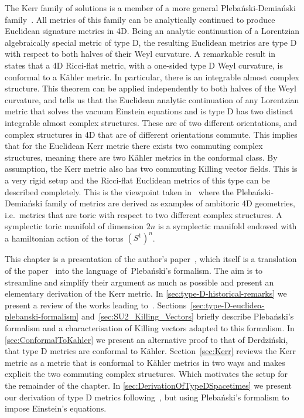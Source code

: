 \documentclass[10pt]{report}
\newcommand{\pleb}[0]{Pleba\'nski}
\newcommand{\demi}[0]{Demia\'nski}
\newcommand{\derd}[0]{Derdzi\'nski}
\theoremstyle{definition}
\begin{document}
The Kerr family of solutions is a member of a more general \pleb{}-\demi{} family~\cite{RotatingChargPleban1976}. All metrics of this family can be analytically continued to produce Euclidean signature metrics in 4D. Being an analytic continuation of a Lorentzian algebraically special metric of type D, the resulting Euclidean metrics are type D with respect to both halves of their Weyl curvature. A remarkable result in~\cite{SelfDualKahleDerdzi1983} states that a 4D Ricci-flat metric, with a one-sided type D Weyl curvature, is conformal to a K\"ahler metric. In particular, there is an integrable almost complex structure. This theorem can be applied independently to both halves of the Weyl curvature, and tells us that the Euclidean analytic continuation of any Lorentzian metric that solves the vacuum Einstein equations and is type D has two distinct integrable almost complex structures. These are of two different orientations, and complex structures in 4D that are of different orientations commute. This implies that for the Euclidean Kerr metric there exists two commuting complex structures, meaning there are two K\"ahler metrics in the conformal class. By assumption, the Kerr metric also has two commuting Killing vector fields. This is a very rigid setup and the Ricci-flat Euclidean metrics of this type can be described completely. This is the viewpoint taken in~\cite{AmbitoricGeomeAposto2013} where the \pleb{}-\demi{} family of metrics are derived as examples of ambitoric 4D geometries, i.e.\ metrics that are toric with respect to two different complex structures. A symplectic toric manifold of dimension $2n$ is a symplectic manifold endowed with a hamiltonian action of the torus ${(S^1)}^n$.

This chapter is a presentation of the author's paper~\cite{Kerr_metric_fro_Krasno_2024}, which itself is a translation of the paper~\cite{AmbitoricGeomeAposto2013} into the language of~\pleb{}'s formalism. The aim is to streamline and simplify their argument as much as possible and present an elementary derivation of the Kerr metric. In \cref{sec:type-D-historical-remarks} we present a review of the works leading to~\cite{AmbitoricGeomeAposto2013}. Sections~\ref{sec:type-D-euclidea-plebanski-formalism} and~\ref{sec:SU2_Killing_Vectors} briefly describe \pleb{}'s formalism and a characterisation of Killing vectors adapted to this formalism. In \cref{sec:ConformalToKahler} we present an alternative proof to that of \derd{}, that type D metrics are conformal to K\"ahler. Section~\ref{sec:Kerr} reviews the Kerr metric as a metric that is conformal to K\"ahler metrics in two ways and makes explicit the two commuting complex structures. Which motivates the setup for the remainder of the chapter. In \cref{sec:DerivationOfTypeDSpacetimes} we present our derivation of type D metrics following~\cite{AmbitoricGeomeAposto2013}, but using \pleb{}'s formalism to impose Einstein's equations.
\end{document}
